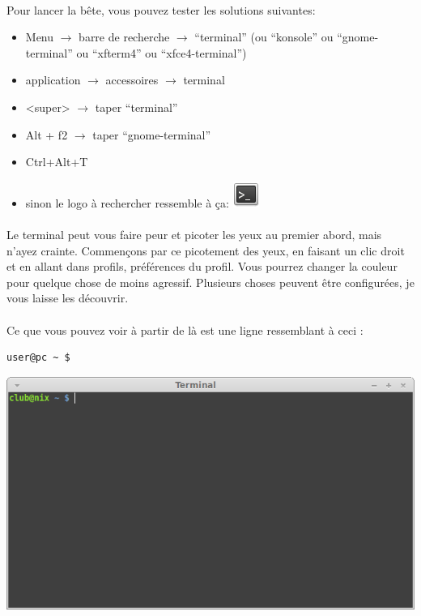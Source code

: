 \paragraph{} Pour lancer la bête, vous pouvez tester les solutions suivantes:
\begin{itemize}
	\item Menu $\rightarrow$ barre de recherche $\rightarrow$ ``terminal'' (ou
		``konsole'' ou ``gnome-terminal'' ou ``xfterm4'' ou ``xfce4-terminal'')
	\item application $\rightarrow$ accessoires $\rightarrow$ terminal
	\item <super> $\rightarrow$ taper ``terminal''
	\item Alt + f2 $\rightarrow$ taper ``gnome-terminal''
	\item Ctrl+Alt+T
	\item sinon le logo à rechercher ressemble à ça:
		\includegraphics[scale=0.7]{res/Images/termIcon}
\end{itemize}

\paragraph{} Le terminal peut vous faire peur et picoter les yeux au premier
abord, mais n'ayez crainte. Commençons par ce picotement des yeux, en faisant
un clic droit et en allant dans profils, préférences du profil. Vous pourrez
changer la couleur pour quelque chose de moins agressif. Plusieurs choses
peuvent être configurées, je vous laisse les découvrir.

\paragraph{} Ce que vous pouvez voir à partir de là est une ligne ressemblant à
ceci :
\begin{lstlisting}
user@pc ~ $
\end{lstlisting}


\begin{center}
	\includegraphics[scale=0.42]{res/Images/terminal}
\end{center}

